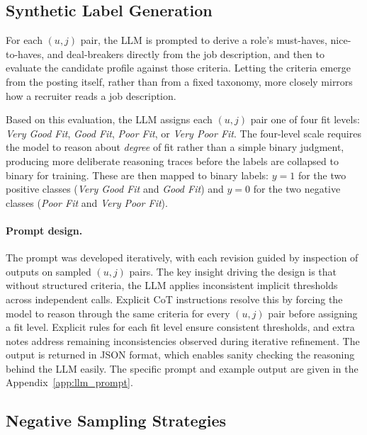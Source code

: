 \subsection{Synthetic Label Generation}
\label{sec:recruiter_llm}

For each $(u,j)$ pair, the \gls{LLM} is prompted to derive a role's must-haves, nice-to-haves, and deal-breakers directly from the job description, and then to evaluate the candidate profile against those criteria. Letting the criteria emerge from the posting itself, rather than from a fixed taxonomy, more closely mirrors how a recruiter reads a job description.

Based on this evaluation, the \gls{LLM} assigns each $(u,j)$ pair one of four 
fit levels: \textit{Very Good Fit}, \textit{Good Fit}, \textit{Poor Fit}, 
or \textit{Very Poor Fit}. The four-level scale requires the model to reason about 
\textit{degree} of fit rather than a simple binary judgment, 
producing more deliberate reasoning traces before the labels 
are collapsed to binary for training. These are then mapped to binary labels: $y = 1$ for 
the two positive classes (\textit{Very Good Fit} and \textit{Good Fit}) and $y = 0$ for the two negative classes (\textit{Poor Fit} and \textit{Very Poor Fit}).

\paragraph{Prompt design.}
The prompt was developed iteratively, with each revision guided by inspection of outputs on sampled $(u,j)$ pairs. The key insight driving the design is that without structured criteria, the \gls{LLM} applies inconsistent implicit thresholds across independent calls. Explicit \gls{CoT} instructions resolve this by forcing the model to 
reason through the same criteria for every $(u,j)$ pair before 
assigning a fit level. Explicit rules for each fit level ensure 
consistent thresholds, and extra notes address remaining inconsistencies 
observed during iterative refinement. The output is returned in JSON format, which enables sanity checking the reasoning behind the \gls{LLM} easily. The specific prompt and example output are given in the Appendix~\ref{app:llm_prompt}.

\subsection{Negative Sampling Strategies}
\label{sec:recruiter_balanced}


